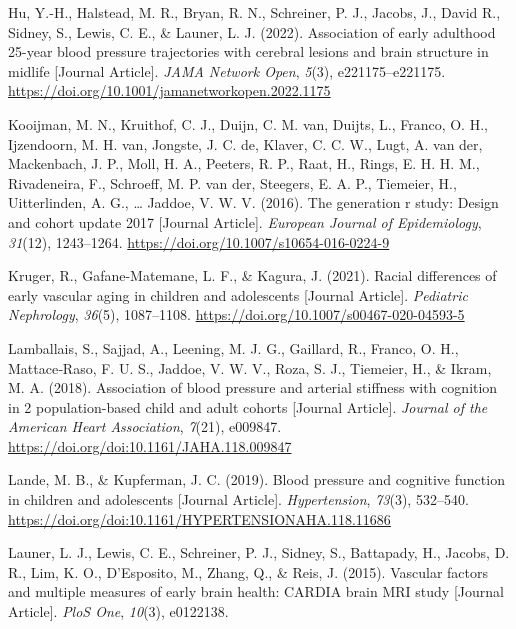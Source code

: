 \documentclass[
  letterpaper,
  DIV=11,
  numbers=noendperiod]{scrreport}
\newlength{\cslhangindent}
\newenvironment{CSLReferences}[2] %
 {\begin{list}{}{%
  \setlength{\itemindent}{0pt}
  \setlength{\leftmargin}{0pt}
  \setlength{\parsep}{0pt}
  \ifodd #1
   \setlength{\leftmargin}{\cslhangindent}
   \setlength{\itemindent}{-1\cslhangindent}
  \fi
  \setlength{\itemsep}{#2\baselineskip}}}
 {\end{list}}
\begin{document}
\begin{CSLReferences}{1}{0}
Hu, Y.-H., Halstead, M. R., Bryan, R. N., Schreiner, P. J., Jacobs, J.,
David R., Sidney, S., Lewis, C. E., \& Launer, L. J. (2022). Association
of early adulthood 25-year blood pressure trajectories with cerebral
lesions and brain structure in midlife {[}Journal Article{]}. \emph{JAMA
Network Open}, \emph{5}(3), e221175--e221175.
\url{https://doi.org/10.1001/jamanetworkopen.2022.1175}

Kooijman, M. N., Kruithof, C. J., Duijn, C. M. van, Duijts, L., Franco,
O. H., Ijzendoorn, M. H. van, Jongste, J. C. de, Klaver, C. C. W., Lugt,
A. van der, Mackenbach, J. P., Moll, H. A., Peeters, R. P., Raat, H.,
Rings, E. H. H. M., Rivadeneira, F., Schroeff, M. P. van der, Steegers,
E. A. P., Tiemeier, H., Uitterlinden, A. G., \ldots{} Jaddoe, V. W. V.
(2016). The generation r study: Design and cohort update 2017 {[}Journal
Article{]}. \emph{European Journal of Epidemiology}, \emph{31}(12),
1243--1264. \url{https://doi.org/10.1007/s10654-016-0224-9}

Kruger, R., Gafane-Matemane, L. F., \& Kagura, J. (2021). Racial
differences of early vascular aging in children and adolescents
{[}Journal Article{]}. \emph{Pediatric Nephrology}, \emph{36}(5),
1087--1108. \url{https://doi.org/10.1007/s00467-020-04593-5}

Lamballais, S., Sajjad, A., Leening, M. J. G., Gaillard, R., Franco, O.
H., Mattace‐Raso, F. U. S., Jaddoe, V. W. V., Roza, S. J., Tiemeier, H.,
\& Ikram, M. A. (2018). Association of blood pressure and arterial
stiffness with cognition in 2 population-based child and adult cohorts
{[}Journal Article{]}. \emph{Journal of the American Heart Association},
\emph{7}(21), e009847. \url{https://doi.org/doi:10.1161/JAHA.118.009847}

Lande, M. B., \& Kupferman, J. C. (2019). Blood pressure and cognitive
function in children and adolescents {[}Journal Article{]}.
\emph{Hypertension}, \emph{73}(3), 532--540.
\url{https://doi.org/doi:10.1161/HYPERTENSIONAHA.118.11686}

Launer, L. J., Lewis, C. E., Schreiner, P. J., Sidney, S., Battapady,
H., Jacobs, D. R., Lim, K. O., D'Esposito, M., Zhang, Q., \& Reis, J.
(2015). Vascular factors and multiple measures of early brain health:
CARDIA brain MRI study {[}Journal Article{]}. \emph{PloS One},
\emph{10}(3), e0122138.


\end{CSLReferences}
\end{document}

